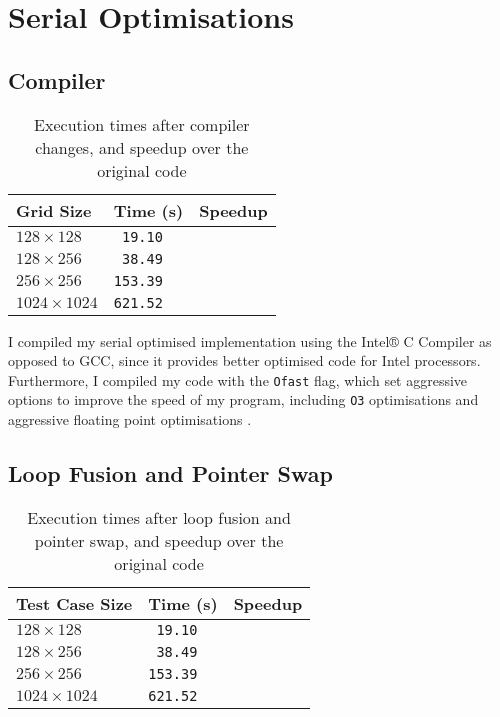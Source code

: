 \documentclass[11pt, twocolumn, a4paper]{article}
\begin{document}
\section{Serial Optimisations}

\subsection{Compiler}

\begin{table}[htbp]
  \begin{center}
  \caption{Execution times after compiler changes, and speedup over the original code}\label{tab:compiler_changes}
  \begin{tabular}{l | l l} 
      \hline\hline
      Grid Size&Time (s)&Speedup\\
      \hline
      $128 \times 128$&\texttt{ 19.10}\\
      $128 \times 256$&\texttt{ 38.49}\\
      $256 \times 256$&\texttt{153.39}\\
      $1024 \times 1024$&\texttt{621.52}\\
      \hline
    \end{tabular}
  \end{center}
\end{table} 

I compiled my serial optimised implementation using the Intel® C Compiler as opposed to GCC, since it provides better optimised code for Intel processors.
Furthermore, I compiled my code with the \texttt{Ofast} flag, which set aggressive options to improve the speed of my program, including \texttt{O3} optimisations and aggressive floating point optimisations \cite{icc}.

\subsection{Loop Fusion and Pointer Swap}

\begin{table}[htbp]
  \begin{center}
  \caption{Execution times after loop fusion and pointer swap, and speedup over the original code}\label{tab:loop_fusion_pointer_swap}
  \begin{tabular}{l | l l} 
      \hline\hline
      Test Case Size&Time (s)&Speedup\\
      \hline
      $128 \times 128$&\texttt{ 19.10}\\
      $128 \times 256$&\texttt{ 38.49}\\
      $256 \times 256$&\texttt{153.39}\\
      $1024 \times 1024$&\texttt{621.52}\\
      \hline
    \end{tabular}
  \end{center}
\end{table} 
\end{document}
